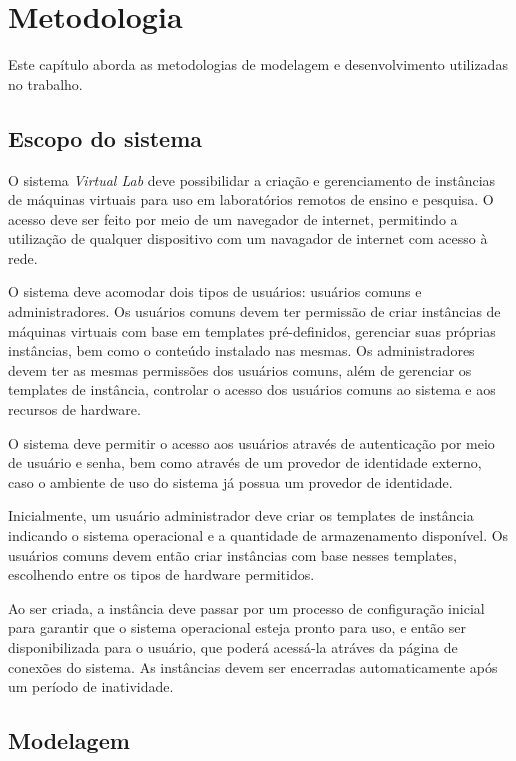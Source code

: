 
\chapter{Metodologia}
\label{cap:metodologia}

Este capítulo aborda as metodologias de modelagem e desenvolvimento utilizadas no trabalho.

\section{Escopo do sistema}
\label{sec:escopoDoSistema}

O sistema \textit{Virtual Lab} deve possibilidar a criação e gerenciamento de instâncias de máquinas virtuais para uso em laboratórios remotos de ensino e pesquisa.
O acesso deve ser feito por meio de um navegador de internet, permitindo a utilização de qualquer dispositivo com um navagador de internet com acesso à rede.

O sistema deve acomodar dois tipos de usuários: usuários comuns e administradores.
Os usuários comuns devem ter permissão de criar instâncias de máquinas virtuais com base em templates pré-definidos, gerenciar suas próprias instâncias, bem como o conteúdo instalado nas mesmas.
Os administradores devem ter as mesmas permissões dos usuários comuns, além de gerenciar os templates de instância, controlar o acesso dos usuários comuns ao sistema e aos recursos de hardware.

O sistema deve permitir o acesso aos usuários através de autenticação por meio de usuário e senha, bem como através de um provedor de identidade externo, caso o ambiente de uso do sistema já possua um provedor de identidade.

Inicialmente, um usuário administrador deve criar os templates de instância indicando o sistema operacional e a quantidade de armazenamento disponível.
Os usuários comuns devem então criar instâncias com base nesses templates, escolhendo entre os tipos de hardware permitidos.

Ao ser criada, a instância deve passar por um processo de configuração inicial para garantir que o sistema operacional esteja pronto para uso, e então ser disponibilizada para o usuário, que poderá acessá-la atráves da página de conexões do sistema. As instâncias devem ser encerradas automaticamente após um período de inatividade.

\section{Modelagem}
\label{sec:modelagemDoSistema}

